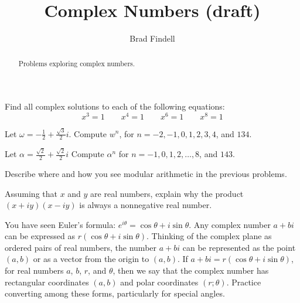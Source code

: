 \documentclass[space,nooutcomes]{ximera}
\title{Complex Numbers (draft)}
\author{Brad Findell}
\begin{document}
\begin{abstract}
Problems exploring complex numbers.   
\end{abstract}
\maketitle


\begin{problem}
Find all complex solutions to each of the following equations: 
\[
x^3=1 \qquad x^4=1 \qquad x^6 = 1 \qquad x^8 = 1
\]
\vfill
\end{problem}
\newpage 

\begin{problem}
Let $\omega=-\tfrac{1}{2}+\tfrac{\sqrt{3}}{2}i$.  Compute $w^n$, for $n = -2, -1, 0, 1, 2, 3, 4$, and $134$.  
\vfill
\end{problem}

\begin{problem} 
Let $\alpha=\tfrac{\sqrt{2}}{2}+\tfrac{\sqrt{2}}{2}i$ Compute $\alpha^n$ for $n = -1, 0, 1, 2, \dots, 8$, and $143$.  
\vfill
\end{problem}


\begin{problem}
Describe where and how you see modular arithmetic in the previous problems.
\vfill
\end{problem}

\newpage

\begin{problem}
Assuming that $x$ and $y$ are real numbers, explain why the product $(x+iy)(x-iy)$ is always a nonnegative real number. 
\vfill
\end{problem}


You have seen Euler's formula: $e^{i\theta}=\cos\theta +i\sin\theta$.  Any complex number $a+bi$ can be expressed as $r(\cos\theta +i\sin\theta)$.  Thinking of the complex plane as ordered pairs of real numbers, the number $a+bi$ can be represented as the point $(a,b)$ or as a vector from the origin to
$(a,b)$.  If $a+bi = r(\cos\theta +i\sin\theta)$, for real numbers $a$, $b$, $r$, and $\theta$, then we say that the complex number has rectangular coordinates $(a,b)$ and polar coordinates $(r;\theta)$.  Practice converting among these forms, particularly for special angles.
\end{document}

